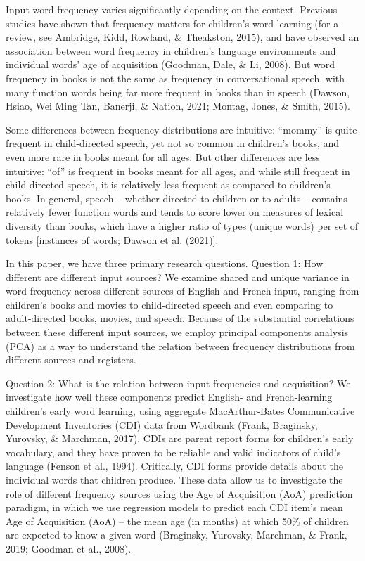 \documentclass[10pt, letterpaper]{article}
\begin{document}
Input word frequency varies significantly depending on the context.
Previous studies have shown that frequency matters for children's word
learning (for a review, see Ambridge, Kidd, Rowland, \& Theakston,
2015), and have observed an association between word frequency in
children's language environments and individual words' age of
acquisition (Goodman, Dale, \& Li, 2008). But word frequency in books is
not the same as frequency in conversational speech, with many function
words being far more frequent in books than in speech (Dawson, Hsiao,
Wei Ming Tan, Banerji, \& Nation, 2021; Montag, Jones, \& Smith, 2015).

Some differences between frequency distributions are intuitive:
``mommy'' is quite frequent in child-directed speech, yet not so common
in children's books, and even more rare in books meant for all ages. But
other differences are less intuitive: ``of'' is frequent in books meant
for all ages, and while still frequent in child-directed speech, it is
relatively less frequent as compared to children's books. In general,
speech -- whether directed to children or to adults -- contains
relatively fewer function words and tends to score lower on measures of
lexical diversity than books, which have a higher ratio of types (unique
words) per set of tokens {[}instances of words; Dawson et al. (2021){]}.

In this paper, we have three primary research questions. Question 1: How
different are different input sources? We examine shared and unique
variance in word frequency across different sources of English and
French input, ranging from children's books and movies to child-directed
speech and even comparing to adult-directed books, movies, and speech.
Because of the substantial correlations between these different input
sources, we employ principal components analysis (PCA) as a way to
understand the relation between frequency distributions from different
sources and registers.

Question 2: What is the relation between input frequencies and
acquisition? We investigate how well these components predict English-
and French-learning children's early word learning, using aggregate
MacArthur-Bates Communicative Development Inventories (CDI) data from
Wordbank (Frank, Braginsky, Yurovsky, \& Marchman, 2017). CDIs are
parent report forms for children's early vocabulary, and they have
proven to be reliable and valid indicators of child's language (Fenson
et al., 1994). Critically, CDI forms provide details about the
individual words that children produce. These data allow us to
investigate the role of different frequency sources using the Age of
Acquisition (AoA) prediction paradigm, in which we use regression models
to predict each CDI item's mean Age of Acquisition (AoA) -- the mean age
(in months) at which 50\% of children are expected to know a given word
(Braginsky, Yurovsky, Marchman, \& Frank, 2019; Goodman et al., 2008).
\end{document}
